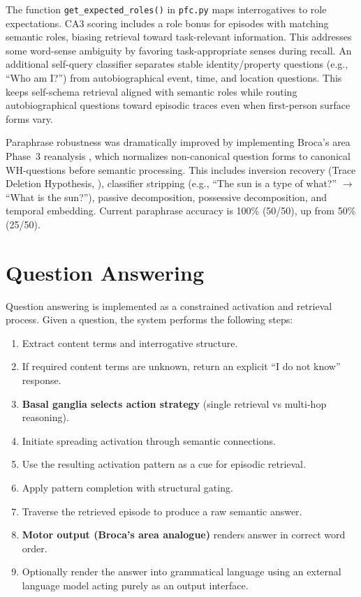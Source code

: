 \documentclass[11pt]{article}
\begin{document}
The function \texttt{get\_expected\_roles()} in \texttt{pfc.py} maps interrogatives to 
role expectations. CA3 scoring includes a role bonus for episodes with matching semantic 
roles, biasing retrieval toward task-relevant information. This addresses some word-sense 
ambiguity by favoring task-appropriate senses during recall.
An additional self-query classifier separates stable identity/property questions (e.g., ``Who am I?'') from autobiographical event, time, and location questions. This keeps self-schema retrieval aligned with semantic roles while routing autobiographical questions toward episodic traces even when first-person surface forms vary.

Paraphrase robustness was dramatically improved by implementing Broca's area Phase~3
reanalysis \citep{friederici2011brain}, which normalizes non-canonical question forms
to canonical WH-questions before semantic processing. This includes inversion recovery
(Trace Deletion Hypothesis, \citealt{grodzinsky2000neurology}), classifier stripping
\citep{croft2001radical} (e.g., ``The sun is a type of what?'' $\rightarrow$ ``What is the sun?''), passive decomposition, possessive decomposition, and temporal
embedding. Current paraphrase accuracy is 100\% (50/50), up from 50\% (25/50).

\section{Question Answering}

Question answering is implemented as a constrained activation and retrieval process.
Given a question, the system performs the following steps:

\begin{enumerate}
\item Extract content terms and interrogative structure.
\item If required content terms are unknown, return an explicit ``I do not know'' response.
\item \textbf{Basal ganglia selects action strategy} (single retrieval vs multi-hop reasoning).
\item Initiate spreading activation through semantic connections.
\item Use the resulting activation pattern as a cue for episodic retrieval.
\item Apply pattern completion with structural gating.
\item Traverse the retrieved episode to produce a raw semantic answer.
\item \textbf{Motor output (Broca's area analogue)} renders answer in correct word order.
\item Optionally render the answer into grammatical language using an external
      language model acting purely as an output interface.
\end{enumerate}
\end{document}
